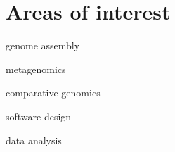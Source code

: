 \section{Areas of interest}
\begin{innerlist}
\item genome assembly
\item metagenomics
\item comparative genomics
\item software design
\item data analysis

\end{innerlist}
